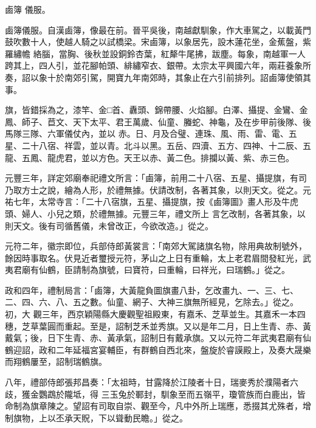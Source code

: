 
\begin{pinyinscope}

 鹵簿
 儀服。



 鹵簿儀服。自漢鹵簿，像最在前。晉平吳後，南越獻馴象，作大車駕之，以載黃門鼓吹數十人，使越人騎之以試橋梁。宋鹵簿，以象居先，設木蓮花坐，金蕉盤，紫羅繡幨
 絡腦，當胸、後秋並設銅鈴杏葉，紅犛牛尾拂，跋塵。每象，南越軍一人跨其上，四人引，並花腳帕頭、緋繡窄衣、銀帶。太宗太平興國六年，兩莊養象所奏，詔以象十於南郊引駕，開寶九年南郊時，其象止在六引前排列。詔鹵簿使領其事。



 旗，皆錯採為之，漆竿、金□首、纛頭、錦帶腰、火焰腳。白澤、攝提、金鸞、金鳳、師子、苣文、天下太平、君王萬歲、仙童、螣蛇、神龜，及在步甲前後隊、後馬隊三隊、六軍儀仗內，並以
 赤。日、月及合璧、連珠、風、雨、雷、電、五星、二十八宿、祥雲，並以青。北斗以黑。五岳、四瀆、五方、四神、十二辰、五龍、五鳳、龍虎君，並以方色。天王以赤、黃二色。排攔以黃、紫、赤三色。



 元豐三年，詳定郊廟奉祀禮文所言：「鹵簿，前用二十八宿、五星、攝提旗，有司乃取方士之說，繪為人形，於禮無據。伏請改制，各著其象，以則天文。從之。元祐七年，太常寺言：「二十八宿旗，五星、攝提旗，按《鹵簿圖》畫人形及牛虎頭、婦人、小兒之類，於禮無據。元豐三年，禮文所上
 言乞改制，各著其象，以則天文。後有司循舊儀，未曾改正，今欲改造。」從之。



 元符二年，徽宗即位，兵部侍郎黃裳言：「南郊大駕諸旗名物，除用典故制號外，餘因時事取名。伏見近者璽授元符，茅山之上日有重輪，太上老君眉間發紅光，武夷君廟有仙鶴，臣請制為旗號，曰寶符，曰重輪，曰祥光，曰瑞鶴。」從之。



 政和四年，禮制局言：「鹵簿，大黃龍負圖旗畫八卦，乞改畫九、一、三、七、二、四、六、八、五之數。仙童、網子、大神三旗無所經見，乞除去。」從之。初，大
 觀三年，西京穎陽縣大慶觀聖祖殿東，有嘉禾、芝草並生。其嘉禾一本四穗，芝草葉圓而重起。至是，詔制芝禾並秀旗。又以是年二月，日上生青、赤、黃戴氣；後，日下生青、赤、黃承氣，詔制日有戴承旗。又以元符二年武夷君廟有仙鶴迎詔，政和二年延福宮宴輔臣，有群鶴自西北來，盤旋於睿謨殿上，及奏大晟樂而翔鶴屢至，詔制瑞鶴旗。



 八年，禮部侍郎張邦昌奏：「太祖時，甘露降於江陵者十日，瑞麥秀於濮陽者六歧，獲金鸚鵡於隴坻，得
 三玉兔於鄆封，馴象至而五嶺平，瓊管族而白鹿出，皆命制為旗章陳之。望詔有司取自崇、觀至今，凡中外所上瑞應，悉掇其尤殊者，增制旗物，上以丕承天貺，下以聳動民瞻。」從之。




\end{pinyinscope}
